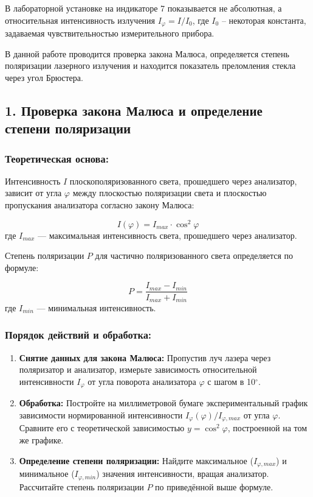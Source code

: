 В лабораторной установке на индикаторе 7 показывается не абсолютная, а относительная интенсивность излучения $I_{\varphi} = I/I_0$, где $I_0$ -- некоторая константа, задаваемая чувствительностью измерительного прибора.

\newpage
{}
В данной работе проводится проверка закона Малюса, определяется степень поляризации лазерного излучения и находится показатель преломления стекла через угол Брюстера.

\subsection*{1. Проверка закона Малюса и определение степени поляризации}

\subsubsection*{Теоретическая основа:}
Интенсивность $I$ плоскополяризованного света, прошедшего через анализатор, зависит от угла $\varphi$ между плоскостью поляризации света и плоскостью пропускания анализатора согласно закону Малюса:

\begin{equation}
    I(\varphi) = I_{max} \cdot \cos^2{\varphi}
    \label{eq:malus_law}
\end{equation}
где $I_{max}$ --- максимальная интенсивность света, прошедшего через анализатор.

Степень поляризации $P$ для частично поляризованного света определяется по формуле:

\begin{equation}
    P = \frac{I_{max} - I_{min}}{I_{max} + I_{min}}
    \label{eq:degree_of_polarization}
\end{equation}
где $I_{min}$ --- минимальная интенсивность.

\subsubsection*{Порядок действий и обработка:}
\begin{enumerate}
    \item \textbf{Снятие данных для закона Малюса:} Пропустив луч лазера через поляризатор и анализатор, измерьте зависимость относительной интенсивности $I_\varphi$ от угла поворота анализатора $\varphi$ с шагом в 10$^\circ$.
    
    \item \textbf{Обработка:} Постройте на миллиметровой бумаге экспериментальный график зависимости нормированной интенсивности $I_\varphi(\varphi)/I_{\varphi, max}$ от угла $\varphi$. Сравните его с теоретической зависимостью $y = \cos^2{\varphi}$, построенной на том же графике.
    
    \item \textbf{Определение степени поляризации:} Найдите максимальное ($I_{\varphi, max}$) и минимальное ($I_{\varphi, min}$) значения интенсивности, вращая анализатор. Рассчитайте степень поляризации $P$ по приведённой выше формуле.
\end{enumerate}

